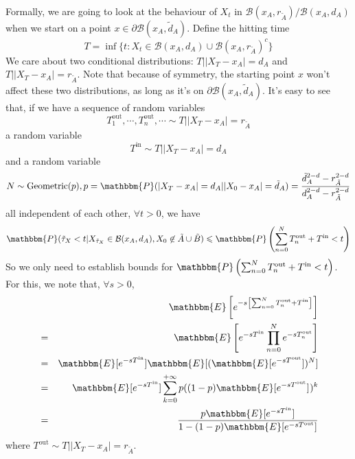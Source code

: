 \documentclass[english, aip, jcp, priprint, graphicx,floatfix]{revtex4-1}
\newcommand{\nin}{\not\in}
\newcommand{\tmop}[1]{\ensuremath{\operatorname{#1}}}
\theoremstyle{plain}
\theoremstyle{definition}
\theoremstyle{plain}
\begin{document}
Formally, we are going to look at the behaviour of $X_t$ in $\mathcal{B} (x_A,
r_{\tilde{A}}) / \mathcal{B} (x_A, d_A)$ when we start on a point $x \in
\partial \mathcal{B} (x_A, \tilde{d}_A)$. Define the hitting time
\[ T = \inf \{ t : X_t \in \mathcal{B} (x_A, d_A) \cup \mathcal{B} (x_A,
r_{\tilde{A}})^c \} \]
We care about two conditional distributions: $T| | X_T - x_A | = d_A$ and $T|
| X_T - x_A | = r_{\tilde{A}}$. Note that because of symmetry, the starting
point $x$ won't affect these two distributions, as long as it's on $\partial
\mathcal{B} (x_A, \tilde{d}_A)$. It's easy to see that, if we have a sequence
of random variables
\[ T^{\tmop{out}}_1, \cdots, T^{\tmop{out}}_n, \cdots \sim T| | X_T - x_A | =
r_{\tilde{A}} \]
a random variable
\[ T^{\tmop{in}} \sim T| | X_T - x_A | = d_A \]
and a random variable
\[ N \sim \tmop{Geometric} (p), p =\mathbbm{P} (| X_T - x_A | = d_A | | X_0 -
x_A | = \tilde{d}_A) = \frac{\tilde{d}_A^{2 - d} - r_{\tilde{A}}^{2 -
d}}{d_A^{2 - d} - r_{\tilde{A}}^{2 - d}} \]
all independent of each other, $\forall t > 0$, we have
\[ \mathbbm{P} (\tilde{\tau}_X < t|X_{\tilde{\tau}_X} \in \mathcal{B} (x_A,
d_A), X_0 \nin \tilde{A} \cup \tilde{B}) \leqslant \mathbbm{P} \left(
\sum_{n = 0}^N T_n^{\tmop{out}} + T^{\tmop{in}} < t \right) \]
So we only need to establish bounds for $\mathbbm{P} \left( \sum_{n = 0}^N
T_n^{\tmop{out}} + T^{\tmop{in}} < t \right)$. For this, we note that,
$\forall s > 0$,
\begin{eqnarray*}
&  & \mathbbm{E} \left[ e^{- s \left[ \sum_{n = 0}^N T_n^{\tmop{out}} +
T^{\tmop{in}} \right]} \right]\\
& = & \mathbbm{E} \left[ e^{- sT^{\tmop{in}}} \prod_{n = 0}^N e^{-
sT_n^{\tmop{out}}} \right]\\
& = & \mathbbm{E} [e^{- sT^{\tmop{in}}}] \mathbbm{E} [(\mathbbm{E} [e^{-
sT^{\tmop{out}}}])^N]\\
& = & \mathbbm{E} [e^{- sT^{\tmop{in}}}] \sum_{k = 0}^{+ \infty} p ((1 - p)
\mathbbm{E} [e^{- sT^{\tmop{out}}}]^{})^k\\
& = & \frac{p\mathbbm{E} [e^{- sT^{\tmop{in}}}]}{1 - (1 - p) \mathbbm{E}
[e^{- sT^{\tmop{out}}}]}
\end{eqnarray*}
where $T^{\tmop{out}} \sim T| | X_T - x_A | = r_{\tilde{A}}$.
\end{document}
